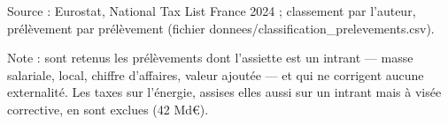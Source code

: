Source : Eurostat, National Tax List France 2024 ; classement par l'auteur, prélèvement par prélèvement (fichier donnees/classification\_prelevements.csv).\par Note : sont retenus les prélèvements dont l'assiette est un intrant — masse salariale, local, chiffre d'affaires, valeur ajoutée — et qui ne corrigent aucune externalité. Les taxes sur l'énergie, assises elles aussi sur un intrant mais à visée corrective, en sont exclues (42 Md\euro{}).
